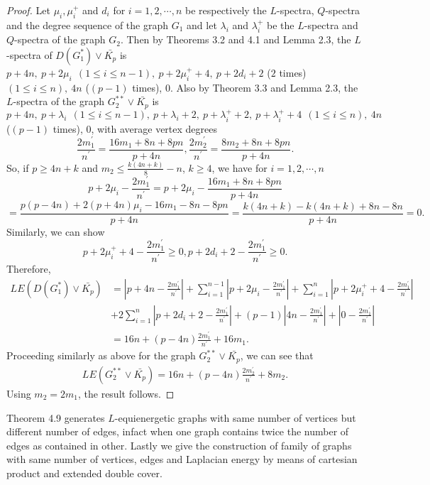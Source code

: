 \documentclass[12pt,a4paper]{amsart}
\theoremstyle{theorem}
\theoremstyle{definition}
\numberwithin{equation}{section} \makeatletter
\begin{document}
\begin{proof}
Let $\mu_i, \mu_i^+$ and $d_i$ for $i=1,2,\cdots,n$ be respectively the $L$-spectra, $Q$-spectra and the degree sequence of the graph $G_1$ and let $\lambda_i$ and $\lambda_i^+$ be the $L$-spectra and $Q$-spectra of the graph $G_2$. Then by Theorems 3.2 and 4.1 and Lemma 2.3, the $L$-spectra of $D(G_1^*)\vee \bar{K_p}$ is $p+4n,~p+2\mu_i ~~(1\leq i\leq n-1), ~p+2\mu_i^{+}+4, ~p+2d_i+2$ ($2$ times) $(1\leq i\leq n), ~4n $ ($(p-1)$ times), $0$. Also by Theorem 3.3 and Lemma 2.3, the $L$-spectra of the graph $G_2^{**}\vee \bar{K_p}$ is $p+4n, ~p+\lambda_i ~~(1\leq i\leq n-1), ~p+\lambda_i+2, ~p+\lambda_i^{+}+2, ~p+\lambda_i^{+}+4 ~~(1\leq i\leq n), ~4n$($(p-1)$ times), $0$, with average vertex degrees
$$\frac{2m_1^{\prime}}{n^{\prime}}=\frac{16m_1+8n+8pn}{p+4n} , \frac{2m_2^{\prime}}{n^{\prime}}=\frac{8m_2+8n+8pn}{p+4n}.$$
So, if $p\geq 4n+k$ and $m_2\leq \frac{k(4n+k)}{8}-n$, $k\geq 4$, we have for $i=1,2,\cdots,n$
$$p+2\mu_i-\frac{2m_1^{\prime}}{n^{\prime}}=p+2\mu_i-\frac{16m_1+8n+8pn}{p+4n}$$
$$=\frac{p(p-4n)+2(p+4n)\mu_i-16m_1-8n-8pn}{p+4n}=\frac{k(4n+k)-k(4n+k)+8n-8n}{p+4n}=0.$$
Similarly, we can show $$p+2\mu_i^{+}+4-\frac{2m_1^{\prime}}{n^{\prime}}\geq 0, p+2d_i+2-\frac{2m_1^{\prime}}{n^{\prime}}\geq 0.$$
Therefore,
\begin{align*}
LE(D(G_1^*)\vee \bar{K_p})&=|p+4n-\frac{2m_1^{\prime}}{n^{\prime}}|+\sum\limits_{i=1}^{n-1}|p+2\mu_i-\frac{2m_1^{\prime}}{n^{\prime}}|+\sum\limits_{i=1}^{n}|p+2\mu_i^{+}+4-\frac{2m_1^{\prime}}{n^{\prime}}|\\&+2\sum\limits_{i=1}^{n}|p+2d_i+2-\frac{2m_1^{\prime}}{n^{\prime}}|+(p-1)|4n-\frac{2m_1^{\prime}}{n^{\prime}}|+|0-\frac{2m_1^{\prime}}{n^{\prime}}|\\&
=16n+(p-4n)\frac{2m_1^{\prime}}{n^{\prime}}+16m_1.
\end{align*}
\indent Proceeding similarly as above for the graph $G_2^{**}\vee \bar{K_p}$, we can see that
\begin{align*}
LE(G_2^{**}\vee \bar{K_p})=16n+(p-4n)\frac{2m_2^{\prime}}{n^{\prime}}+8m_2.
\end{align*}
\indent Using $m_2=2m_1$, the result follows.
\end{proof}
\indent Theorem 4.9 generates $L$-equienergetic graphs with same number of vertices but different number of edges, infact when one graph contains twice the number of edges as contained in other. Lastly we give the construction of family of graphs with same number of vertices, edges and Laplacian energy by means of cartesian product and extended double cover.
\end{document}
